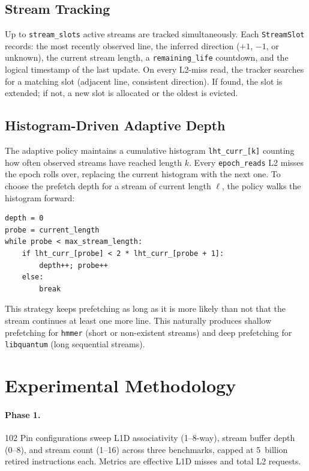\documentclass[11pt,letterpaper]{article}
\begin{document}
\subsection{Stream Tracking}

Up to \texttt{stream\_slots} active streams are tracked simultaneously. Each
\texttt{StreamSlot} records: the most recently observed line, the inferred
direction ($+1$, $-1$, or unknown), the current stream length, a
\texttt{remaining\_life} countdown, and the logical timestamp of the last
update. On every L2-miss read, the tracker searches for a matching slot
(adjacent line, consistent direction). If found, the slot is extended; if not,
a new slot is allocated or the oldest is evicted.

\subsection{Histogram-Driven Adaptive Depth}

The adaptive policy maintains a cumulative histogram \texttt{lht\_curr\_[k]}
counting how often observed streams have reached length $k$. Every
\texttt{epoch\_reads} L2 misses the epoch rolls over, replacing the current
histogram with the next one. To choose the prefetch depth for a stream of
current length $\ell$, the policy walks the histogram forward:

\begin{verbatim}
depth = 0
probe = current_length
while probe < max_stream_length:
    if lht_curr_[probe] < 2 * lht_curr_[probe + 1]:
        depth++; probe++
    else:
        break
\end{verbatim}

This strategy keeps prefetching as long as it is more likely than not that the
stream continues at least one more line. This naturally produces shallow
prefetching for \texttt{hmmer} (short or non-existent streams) and deep
prefetching for \texttt{libquantum} (long sequential streams).

\section{Experimental Methodology}

\paragraph{Phase 1.} 102 Pin configurations sweep L1D associativity (1--8-way),
stream buffer depth (0--8), and stream count (1--16) across three benchmarks,
capped at 5~billion retired instructions each. Metrics are effective L1D misses
and total L2 requests.
\end{document}
